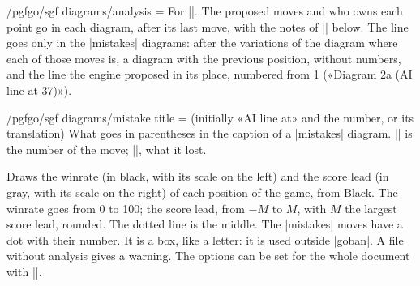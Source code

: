\begin{key}{/pgfgo/sgf diagrams/analysis = }
	For |\sgfdiagrams|. The proposed moves and who owns each point go in each diagram, after its last move, with the notes of |\pgfgocandidates| below. The line goes only in the |mistakes| diagrams: after the variations of the diagram where each of those moves is, a diagram with the previous position, without numbers, and the line the engine proposed in its place, numbered from 1 («Diagram 2a (AI line at 37)»).

	\begin{codeexample}
	\end{codeexample}

\end{key}

\begin{key}{/pgfgo/sgf diagrams/mistake title =  (initially «AI line at» and the number, or its translation)}
	What goes in parentheses in the caption of a |mistakes| diagram. |\pgfgovariationmove| is the number of the move; |\pgfgoloss|, what it lost.

	\begin{codeexample}
	\end{codeexample}
\end{key}

\begin{command}{\sgfgraph{}}
	Draws the winrate (in black, with its scale on the left) and the score lead (in gray, with its scale on the right) of each position of the game, from Black. The winrate goes from 0 to 100; the score lead, from $-M$ to $M$, with $M$ the largest score lead, rounded. The dotted line is the middle. The |mistakes| moves have a dot with their number. It is a box, like a letter: it is used outside |goban|. A file without analysis gives a warning. The options can be set for the whole document with ||.

	\begin{codeexample}[]
	\end{codeexample}
\end{command}

